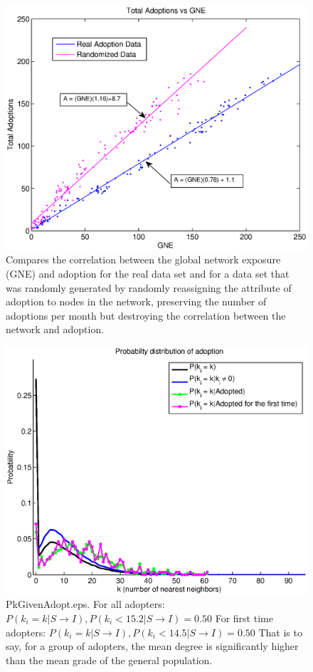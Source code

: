 \documentclass[12pt]{article}
\begin{document}
\begin{figure}[H]
\includegraphics[width = .9\textwidth]{Graficos/GNEandGNErandom2.eps}
\caption{Compares the correlation between the global network exposure (GNE) and adoption for the real data set and for a data set that was randomly generated by randomly reassigning the attribute of adoption to nodes in the network, preserving the number of adoptions per month but destroying the correlation between the network and adoption.}
\label{fig:GNEandGNErandom}
\end{figure}

\begin{figure}[H]
\includegraphics[width = .9\textwidth]{Graficos/PkGivenAdopt.eps}
\caption{PkGivenAdopt.eps. \newline For all adopters: \(P(k_i =k | S \rightarrow I),P(k_i < 15.2 | S \rightarrow I) =0.50\) \newline For first time adopters: \(P(k_i =k | S \rightarrow I), P(k_i < 14.5 | S \rightarrow I) =0.50\) 
\newline That is to say, for a group of adopters, the mean degree is significantly higher than the mean grade of the general population.}
\label{fig:PkGivenAdopt}
\end{figure}
\end{document}
